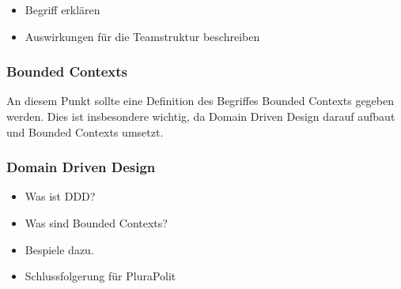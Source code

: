\begin{itemize}
	\item Begriff erklären
	\item Auswirkungen für die Teamstruktur beschreiben
\end{itemize}

\subsubsection{Bounded Contexts}

An diesem Punkt sollte eine Definition des Begriffes Bounded Contexts gegeben werden. Dies ist insbesondere wichtig, da Domain Driven Design darauf aufbaut und Bounded Contexts umsetzt.

\subsubsection{Domain Driven Design}

\begin{itemize}
	\item Was ist DDD?
	\item Was sind Bounded Contexts?
	\item 	Bespiele dazu.
	\item Schlussfolgerung für PluraPolit
\end{itemize}
